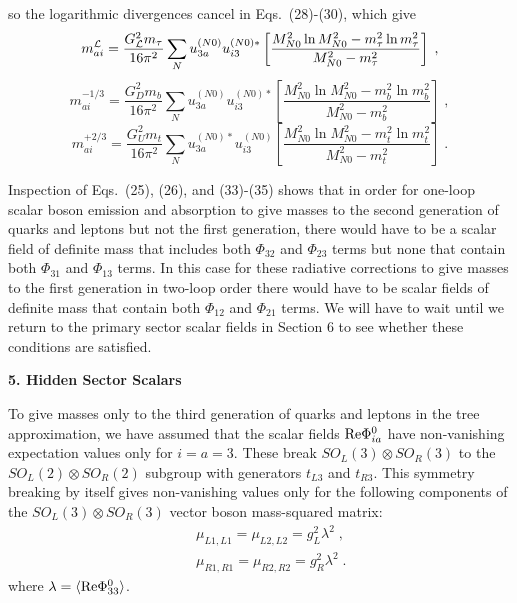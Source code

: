 \documentclass[12pt]{article}
\begin{document}
so the logarithmic divergences cancel in Eqs.~(28)-(30), which give
\begin{equation}
m^{\cal L}_{ai}=\frac{G_{\cal L}^2m_\tau }{16 \pi^2}\sum_{N}  u_{3a}^{(N0)}u_{i3}^{(N0)*}\left[\frac{M_{N0}^2\ln M_{N0}^2-m_\tau^2\ln m_\tau^2}{M_{N0}^2-m_\tau^2}\right]
 \;,
\end{equation}
\begin{equation}
m^{-1/3}_{ai}=\frac{G^2_Dm_b}{16 \pi^2}\sum_{N}  u_{3a}^{(N0)}u_{i3}^{(N0)*}\left[\frac{M_{N0}^2\ln M_{N0}^2-m_b^2\ln m_b^2}{M_{N0}^2-m_b^2}\right]
 \;,
\end{equation}
\begin{equation}
m^{+2/3}_{ai}=\frac{G_U^2m_t}{16 \pi^2}\sum_{N}  u_{3a}^{(N0)*}u_{i3}^{(N0)}\left[\frac{M_{N0}^2\ln M_{N0}^2-m_t^2\ln m_t^2}{M_{N0}^2-m_t^2}\right]
 \;.
\end{equation}

Inspection of Eqs.~(25), (26), and (33)-(35) shows that in order for  one-loop scalar boson emission and absorption to give masses to the second generation of quarks and leptons but not the first generation, there would have to be a scalar field of definite mass that includes both $ \Phi_{32}$  and $ \Phi_{23}$ terms but none that contain  both $ \Phi_{31}$  and $ \Phi_{13}$ terms.  In this case for these radiative corrections to give masses to the first generation in two-loop order there would have to be scalar fields of definite mass that contain both $ \Phi_{12}$  and $ \Phi_{21}$ terms.  
We will have to wait until we return to the primary sector scalar fields in Section 6  to see whether these conditions are satisfied.






\begin{center}
{\bf 5. Hidden Sector Scalars}
\end{center}






To give masses only to the third generation of quarks and leptons in the tree approximation, we have assumed that the scalar fields ${\rm Re}\Phi^0_{ia}$ have non-vanishing expectation values only for $i=a=3$.  These break $SO_L(3)\otimes  SO_R(3)$ to the  $SO_L(2)\otimes  SO_R(2)$ subgroup with generators $t_{L3}$ and $t_{R3}$.  This symmetry breaking by itself gives non-vanishing values only for the following components of the $SO_L(3)\otimes  SO_R(3)$ vector boson mass-squared matrix: 
\begin{eqnarray*}
 &&\mu_{L1,L1}=\mu_{L2,L2}=g_L^2 \lambda^2\;,\\&&
\mu_{R1,R1}=\mu_{R2,R2}=g_R^2 \lambda^2\;.
\end{eqnarray*}
 where $\lambda=\langle{\rm Re}\Phi^0_{33}\rangle$.  
\end{document}
